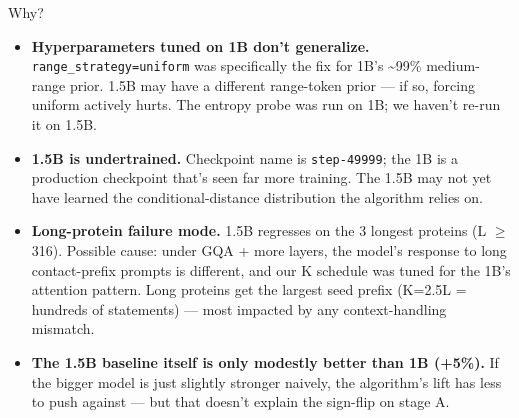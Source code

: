 \documentclass[aspectratio=169,11pt]{beamer}
\newcommand{\code}[1]{\texttt{\small\color{navy}#1}}
\newcommand{\codeS}[1]{\texttt{\scriptsize\color{navy}#1}}
\begin{document}
\begin{frame}{Why?}
  \begin{itemize}
    \setlength\itemsep{0.4em}
    \item \textbf{Hyperparameters tuned on 1B don't generalize.}
      \code{range\_strategy=uniform} was specifically the fix for 1B's
      \textasciitilde{}99\% medium-range prior. 1.5B may have a different
      range-token prior — if so, forcing uniform actively hurts.
      The entropy probe was run on 1B; we haven't re-run it on 1.5B.
    \item \textbf{1.5B is undertrained.} Checkpoint name is
      \codeS{step-49999}; the 1B is a production checkpoint that's seen
      far more training. The 1.5B may not yet have learned the
      conditional-distance distribution the algorithm relies on.
    \item \textbf{Long-protein failure mode.} 1.5B regresses on the 3
      longest proteins (L $\geq$ 316). Possible cause: under GQA + more
      layers, the model's response to long contact-prefix prompts is
      different, and our K schedule was tuned for the 1B's attention
      pattern. Long proteins get the largest seed prefix (K=2.5L =
      hundreds of statements) — most impacted by any context-handling
      mismatch.
    \item \textbf{The 1.5B baseline itself is only modestly better
      than 1B (+5\%).} If the bigger model is just slightly stronger
      naively, the algorithm's lift has less to push against — but
      that doesn't explain the sign-flip on stage A.
  \end{itemize}
\end{frame}
\end{document}
